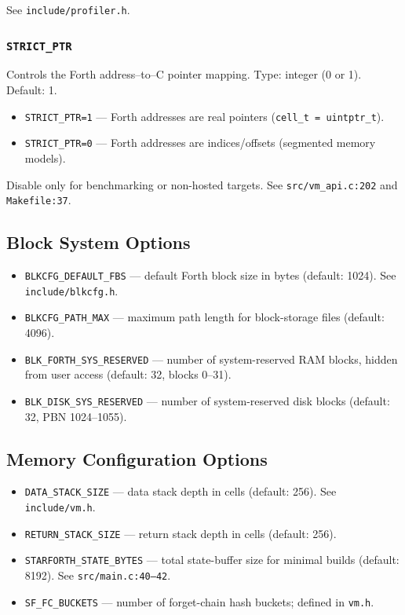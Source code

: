 See \texttt{include/profiler.h}.

\subsubsection{\texttt{STRICT\_PTR}}

Controls the Forth address--to--C pointer mapping. Type: integer (0 or 1).
Default: 1.

\begin{itemize}
  \item \texttt{STRICT\_PTR=1} — Forth addresses are real pointers (\texttt{cell\_t = uintptr\_t}).
  \item \texttt{STRICT\_PTR=0} — Forth addresses are indices/offsets (segmented memory models).
\end{itemize}

Disable only for benchmarking or non-hosted targets. See
\texttt{src/vm\_api.c:202} and \texttt{Makefile:37}.

\subsection{Block System Options}
\label{sec:build-block}

\begin{itemize}
  \item \texttt{BLKCFG\_DEFAULT\_FBS} — default Forth block size in bytes (default: 1024). See \texttt{include/blkcfg.h}.
  \item \texttt{BLKCFG\_PATH\_MAX} — maximum path length for block-storage files (default: 4096).
  \item \texttt{BLK\_FORTH\_SYS\_RESERVED} — number of system-reserved RAM blocks, hidden from user access (default: 32, blocks 0--31).
  \item \texttt{BLK\_DISK\_SYS\_RESERVED} — number of system-reserved disk blocks (default: 32, PBN 1024--1055).
\end{itemize}

\subsection{Memory Configuration Options}
\label{sec:build-memory}

\begin{itemize}
  \item \texttt{DATA\_STACK\_SIZE} — data stack depth in cells (default: 256). See \texttt{include/vm.h}.
  \item \texttt{RETURN\_STACK\_SIZE} — return stack depth in cells (default: 256).
  \item \texttt{STARFORTH\_STATE\_BYTES} — total state-buffer size for minimal builds (default: 8192). See \texttt{src/main.c:40--42}.
  \item \texttt{SF\_FC\_BUCKETS} — number of forget-chain hash buckets; defined in \texttt{vm.h}.
\end{itemize}

